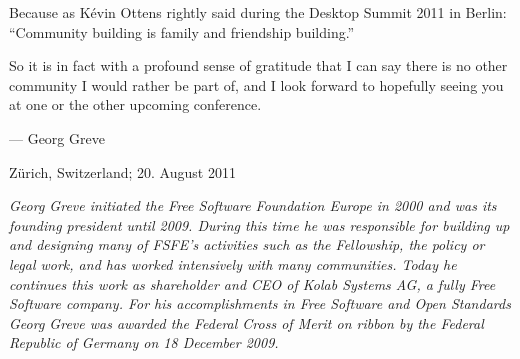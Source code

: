 Because as Kévin Ottens rightly said during the Desktop Summit 2011 in
Berlin: ``Community building is family and friendship building.''

So it is in fact with a profound sense of gratitude that I can say
there is no other community I would rather be part of, and I look
forward to hopefully seeing you at one or the other upcoming
conference.
\newline
\begin{flushright}--- Georg Greve\end{flushright}
\begin{flushright}Zürich, Switzerland; 20. August 2011\end{flushright}

\textit{Georg Greve initiated the Free Software Foundation Europe in
2000 and was its founding president until 2009. During this time he
was responsible for building up and designing many of FSFE's activities
such as the Fellowship, the policy or legal work, and has worked
intensively with many communities. Today he continues this work as
shareholder and CEO of Kolab Systems AG, a fully Free Software company.
For his accomplishments in Free Software and Open Standards Georg
Greve was awarded the Federal Cross of Merit on ribbon by the Federal
Republic of Germany on 18 December 2009.}

\newpage
